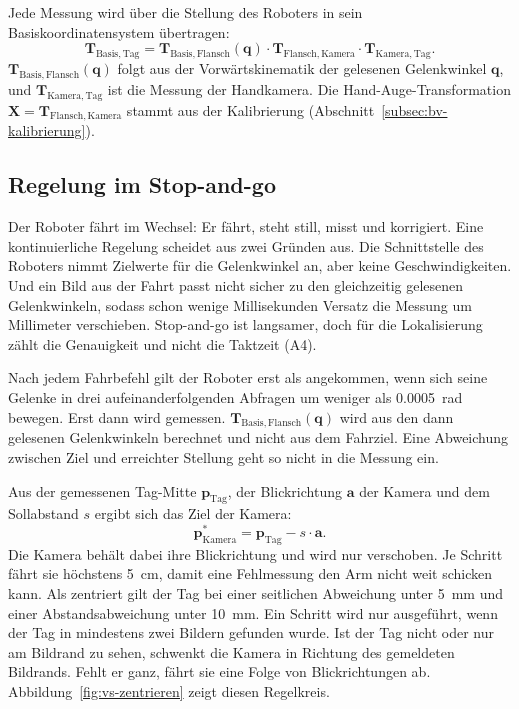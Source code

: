Jede Messung wird über die Stellung des Roboters in sein Basiskoordinatensystem übertragen:
\begin{equation}
    \mathbf{T}_{\mathrm{Basis,Tag}} = \mathbf{T}_{\mathrm{Basis,Flansch}}(\mathbf{q}) \cdot \mathbf{T}_{\mathrm{Flansch,Kamera}} \cdot \mathbf{T}_{\mathrm{Kamera,Tag}} .
    \label{eq:vs-kette}
\end{equation}
$\mathbf{T}_{\mathrm{Basis,Flansch}}(\mathbf{q})$ folgt aus der Vorwärtskinematik der gelesenen Gelenkwinkel $\mathbf{q}$, und $\mathbf{T}_{\mathrm{Kamera,Tag}}$ ist die Messung der Handkamera. Die Hand-Auge-Transformation $\mathbf{X} = \mathbf{T}_{\mathrm{Flansch,Kamera}}$ stammt aus der Kalibrierung (Abschnitt~\ref{subsec:bv-kalibrierung}).

\subsection{Regelung im Stop-and-go}
\label{subsec:vs-regelung}
Der Roboter fährt im Wechsel: Er fährt, steht still, misst und korrigiert. Eine kontinuierliche Regelung scheidet aus zwei Gründen aus. Die Schnittstelle des Roboters nimmt Zielwerte für die Gelenkwinkel an, aber keine Geschwindigkeiten. Und ein Bild aus der Fahrt passt nicht sicher zu den gleichzeitig gelesenen Gelenkwinkeln, sodass schon wenige Millisekunden Versatz die Messung um Millimeter verschieben. Stop-and-go ist langsamer, doch für die Lokalisierung zählt die Genauigkeit und nicht die Taktzeit (A4).

Nach jedem Fahrbefehl gilt der Roboter erst als angekommen, wenn sich seine Gelenke in drei aufeinanderfolgenden Abfragen um weniger als \SI{0,0005}{\radian} bewegen. Erst dann wird gemessen. $\mathbf{T}_{\mathrm{Basis,Flansch}}(\mathbf{q})$ wird aus den dann gelesenen Gelenkwinkeln berechnet und nicht aus dem Fahrziel. Eine Abweichung zwischen Ziel und erreichter Stellung geht so nicht in die Messung ein.

Aus der gemessenen Tag-Mitte $\mathbf{p}_{\mathrm{Tag}}$, der Blickrichtung $\mathbf{a}$ der Kamera und dem Sollabstand $s$ ergibt sich das Ziel der Kamera:
\begin{equation}
    \mathbf{p}^{*}_{\mathrm{Kamera}} = \mathbf{p}_{\mathrm{Tag}} - s \cdot \mathbf{a} .
    \label{eq:vs-ziel}
\end{equation}
Die Kamera behält dabei ihre Blickrichtung und wird nur verschoben. Je Schritt fährt sie höchstens \SI{5}{\centi\metre}, damit eine Fehlmessung den Arm nicht weit schicken kann. Als zentriert gilt der Tag bei einer seitlichen Abweichung unter \SI{5}{\milli\metre} und einer Abstandsabweichung unter \SI{10}{\milli\metre}. Ein Schritt wird nur ausgeführt, wenn der Tag in mindestens zwei Bildern gefunden wurde. Ist der Tag nicht oder nur am Bildrand zu sehen, schwenkt die Kamera in Richtung des gemeldeten Bildrands. Fehlt er ganz, fährt sie eine Folge von Blickrichtungen ab. Abbildung~\ref{fig:vs-zentrieren} zeigt diesen Regelkreis.

